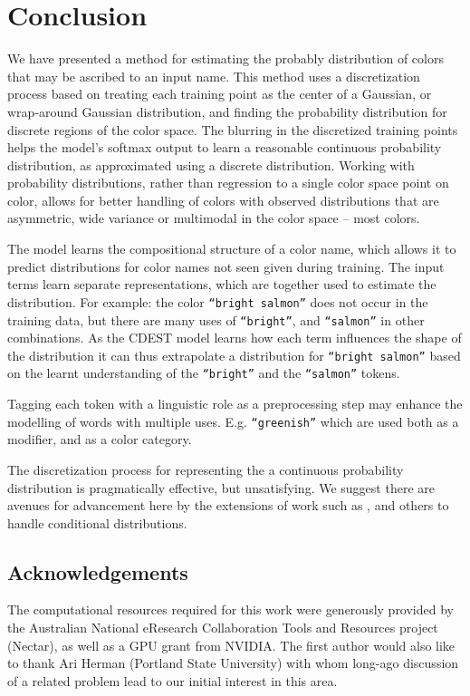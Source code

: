 \documentclass[11pt,letterpaper, twocolumn]{article}
\newcommand{\textcite}{\cite}
\begin{document}
\section{Conclusion}\label{sec:conclusion}
We have presented a method for estimating the probably distribution of colors that may be ascribed to an input name.
This method uses a discretization process based on treating each training point as the center of a Gaussian, or wrap-around Gaussian distribution, and finding the probability distribution for discrete regions of the color space.
The blurring in the discretized training points helps the model's softmax output to learn a reasonable continuous probability distribution, as approximated using a discrete distribution.
Working with probability distributions, rather than regression to a single color space point on color, allows for better handling of colors with observed distributions that are asymmetric, wide variance or multimodal in the color space -- most colors.

The model learns the compositional structure of a color name, which allows it to predict distributions for color names not seen given during training.
The input terms learn separate representations, which are together used to estimate the distribution.
For example: the color \texttt{``bright salmon''} does not occur in the training data, but there are many uses of \texttt{``bright''}, and \texttt{``salmon''} in other combinations.
As the CDEST model learns how each term influences the shape of the distribution it can thus extrapolate a distribution for \texttt{``bright salmon''} based on the learnt understanding of the \texttt{``bright''} and the \texttt{``salmon''} tokens.

Tagging each token with a linguistic role as a preprocessing step
may enhance the modelling of words with multiple uses. E.g. \texttt{``greenish''} which are used both as a modifier, and as a color category.

The discretization process for representing the a continuous probability distribution is pragmatically effective, but unsatisfying.
We suggest there are avenues for advancement here by the extensions of work such as \textcite{1998NNpdfDiffCdf}, \textcite{likas2001probability} and others to handle conditional distributions.

\subsection{Acknowledgements}
The computational resources required for this work were generously provided by the Australian National eResearch Collaboration Tools and Resources project (Nectar),
as well as a GPU grant from NVIDIA.
The first author would also like to thank Ari Herman (Portland State University) with whom long-ago discussion of a related problem lead to our initial interest in this area.




\clearpage
\appendix


\end{document}
